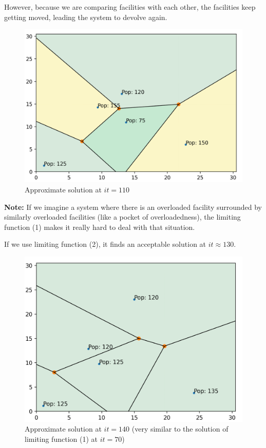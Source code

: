 \documentclass{article}
\begin{document}
However, because we are comparing facilities with each other, the facilities keep getting moved, leading the system to devolve again. 

\begin{figure}[H]
    \centering
    \captionsetup{justification=centering}
    \includegraphics[clip,scale=0.16]{lim1_voronoi_110.png}
    \caption*{Approximate solution at $it = 110$}
    \label{fig:lim-1-2}
\end{figure}

\textbf{Note:} If we imagine a system where there is an overloaded facility surrounded by similarly overloaded facilities (like a pocket of overloadedness), the limiting function (1) makes it really hard to deal with that situation. 

\vspace{12pt}
If we use limiting function (2), it finds an acceptable solution at $it \approx 130$.

\begin{figure}[H]
    \centering
    \captionsetup{justification=centering, width=0.9\linewidth}
    \includegraphics[clip,scale=0.16]{lim2_voronoi_140.png}
    \caption*{Approximate solution at $it = 140$ (very similar to the solution of limiting function (1) at $it = 70$)}
    \label{fig:lim-1-2}
\end{figure}
\end{document}
